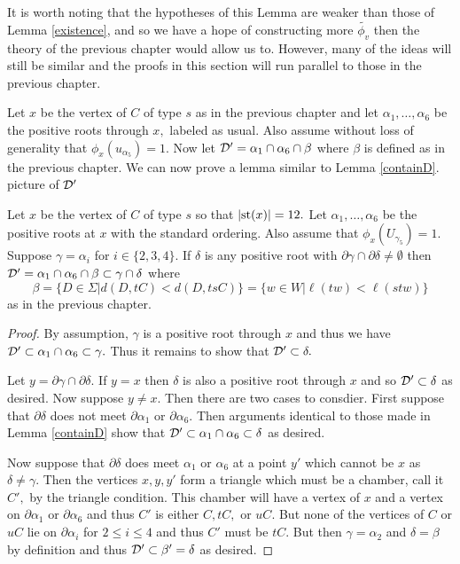 \documentclass[class=book, crop=false]{standalone}
\begin{document}
It is worth noting that the hypotheses of this Lemma are weaker than those of Lemma \ref{existence}, and so we have a hope of constructing more $\tilde{\phi_v}$ then the theory of the previous chapter would allow us to. However, many of the ideas will still be similar and the proofs in this section will run parallel to those in the previous chapter.

Let $x$ be the vertex of $C$ of type $s$ as in the previous chapter and let $\alpha_1,\dots,\alpha_6$ be the positive roots through $x,$ labeled as usual. Also assume without loss of generality that $\phi_x(u_{\alpha_5})=1.$ Now let $\mathcal{D}'=\alpha_1\cap \alpha_6\cap \beta$ where $\beta$ is defined as in the previous chapter. We can now prove a lemma similar to Lemma \ref{containD}.\\
\Huge picture of $\mathcal{D}'$\normalsize\\

\begin{lemma}
	\label{336f2containD}
	Let $x$ be the vertex of $C$ of type $s$ so that $|\mathrm{st}(x)|=12.$ Let $\alpha_1,\dots,\alpha_6$ be the positive roots at $x$ with the standard ordering. Also assume that $\phi_x(U_{\gamma_5})=1.$ Suppose $\gamma=\alpha_i$ for $i\in \{2,3,4\}.$ If $\delta$ is any positive root with $\partial\gamma\cap \partial\delta\neq \emptyset$ then $\mathcal{D}'=\alpha_1\cap \alpha_6\cap \beta\subset \gamma\cap \delta$ where 
	\[
	\beta=\{D\in \Sigma|d(D,tC)<d(D,tsC)\}=\{w\in W|\ell(tw)<\ell(stw)\}
	\]
	as in the previous chapter.
\end{lemma}
\begin{proof}
	By assumption, $\gamma$ is a positive root through $x$ and thus we have $\mathcal{D}'\subset \alpha_1\cap \alpha_6\subset \gamma.$ Thus it remains to show that $\mathcal{D}'\subset \delta.$

	Let $y=\partial\gamma\cap \partial\delta.$ If $y=x$ then $\delta$ is also a positive root through $x$ and so $\mathcal{D}'\subset \delta$ as desired. Now suppose $y\neq x.$ Then there are two cases to consdier. First suppose that $\partial \delta$ does not meet $\partial\alpha_1$ or $\partial\alpha_6.$ Then arguments identical to those made in Lemma \ref{containD} show that $\mathcal{D}'\subset \alpha_1\cap \alpha_6\subset \delta$ as desired.

Now suppose that $\partial\delta$ does meet $\alpha_1$ or $\alpha_6$ at a point $y'$ which cannot be $x$ as $\delta\neq \gamma.$ Then the vertices $x,y,y'$ form a triangle which must be a chamber, call it $C',$ by the triangle condition. This chamber will have a vertex of $x$ and a vertex on $\partial\alpha_1$ or $\partial\alpha_6$ and thus $C'$ is either $C,tC,$ or $uC.$ But none of the vertices of $C$ or $uC$ lie on $\partial\alpha_i$ for $2\le i\le 4$ and thus $C'$ must be $tC.$ But then $\gamma=\alpha_2$ and $\delta=\beta$ by definition and thus $\mathcal{D}'\subset \beta'=\delta$ as desired.
\end{proof}
\end{document}
